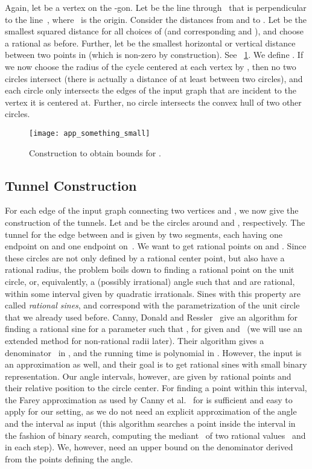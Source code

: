 \documentclass[11pt,a4paper]{article}
\begin{document}
Again, let  be a vertex on the -gon.
Let  be the line through~ that is perpendicular to the line~, where~ is the origin.
Consider the distances from  and  to .
Let  be the smallest squared distance for all choices of  (and corresponding  and ), and choose a rational  as before.
Further, let  be the smallest horizontal or vertical distance between two points in  (which is non-zero by construction).
See \figurename~\ref{fig_app_something_small}.
We define .
If we now choose the radius of the cycle centered at each vertex by , then no two circles intersect (there is actually a distance of at least  between two circles), and each circle only intersects the edges of the input graph that are incident to the vertex it is centered at.
Further, no circle intersects the convex hull of two other circles.

\begin{figure}
\centering
\texttt{[image: app\_something\_small]}
\caption{Construction to obtain bounds for .}
\label{fig_app_something_small}
\end{figure}


\subsection{Tunnel Construction}
For each edge  of the input graph connecting two vertices  and , we now give the construction of the tunnels.
Let  and  be the circles around  and , respectively.
The tunnel for the edge between  and  is given by two segments, each having one endpoint on  and one endpoint on~.
We want to get rational points on  and .
Since these circles are not only defined by a rational center point, but also have a rational radius, the problem boils down to finding a rational point on the unit circle, or, equivalently, a (possibly irrational) angle  such that  and  are rational, within some interval given by quadratic irrationals.
Sines with this property are called \emph{rational sines}, and correspond with the parametrization of the unit circle that we already used before.
Canny, Donald and Ressler~\cite{canny} give an algorithm for finding a rational sine for a parameter  such that , for given  and~ (we will use an extended method for non-rational radii later).
Their algorithm gives a denominator~ in , and the running time is polynomial in .
However, the input  is an approximation as well, and their goal is to get rational sines with small binary representation.
Our angle intervals, however, are given by rational points and their relative position to the circle center.
For finding a point within this interval, the Farey approximation as used by Canny et al.~\cite{canny} for  is sufficient and easy to apply for our setting, as we do not need an explicit approximation of the angle and the interval as input (this algorithm searches a point inside the interval in the fashion of binary search, computing the mediant~ of two rational values~ and  in each step).
We, however, need an upper bound on the denominator  derived from the points defining the angle.
\end{document}

